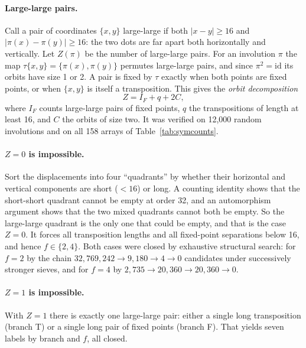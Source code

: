 \documentclass[11pt,a4paper]{article}
\theoremstyle{definition}
\begin{document}
\paragraph{Large-large pairs.} Call a pair of coordinates $\{x,y\}$ large-large if
both $|x-y|\ge16$ and $|\pi(x)-\pi(y)|\ge16$: the two dots are far apart both horizontally and
vertically. Let $Z(\pi)$ be the number of large-large pairs. For an involution $\pi$ the map
$\tau\{x,y\}=\{\pi(x),\pi(y)\}$ permutes large-large pairs, and since $\pi^2=\mathrm{id}$ its
orbits have size 1 or 2. A pair is fixed by $\tau$ exactly when both points are fixed points,
or when $\{x,y\}$ is itself a transposition. This gives the \emph{orbit decomposition}
\[
Z = I_F + q + 2C,
\]
where $I_F$ counts large-large pairs of fixed points, $q$ the transpositions of length at
least 16, and $C$ the orbits of size two. It was verified on 12{,}000 random involutions and
on all 158 arrays of Table~\ref{tab:symcounts}.

\paragraph{$Z=0$ is impossible.} Sort the displacements into four ``quadrants'' by whether
their horizontal and vertical components are short ($<16$) or long. A counting identity shows
that the short-short quadrant cannot be empty at order 32, and an automorphism argument shows
that the two mixed quadrants cannot both be empty. So the large-large quadrant is the only one
that could be empty, and that is the case $Z=0$. It forces all transposition lengths and all
fixed-point separations below 16, and hence $f\in\{2,4\}$. Both cases were closed by
exhaustive structural search: for $f=2$ by the chain $32{,}769{,}242\to9{,}180\to4\to0$
candidates under successively stronger sieves, and for $f=4$ by
$2{,}735\to20{,}360\to20{,}360\to0$.

\paragraph{$Z=1$ is impossible.} With $Z=1$ there is exactly one large-large pair: either a
single long transposition (branch T) or a single long pair of fixed points (branch F). That
yields seven labels by branch and $f$, all closed.
\end{document}
